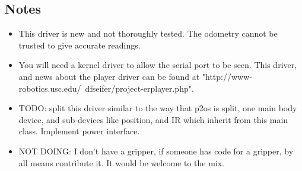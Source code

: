 \subsection*{Notes}
\begin{itemize}
\item This driver is new and not thoroughly tested.  The odometry cannot be trusted to give accurate readings.

\item You will need a kernel driver to allow the serial port to be seen.  This driver, and news about the player driver can be found at "http://www-robotics.usc.edu/~dfseifer/project-erplayer.php".

\item TODO: split this driver similar to the way that p2os is split, one main body device, and sub-devices like position, and IR which inherit from this main class.  Implement power interface.

\item NOT DOING: I don't have a gripper, if someone has code for a gripper, by all means contribute it.  It would be welcome to the mix.
\end{itemize}

